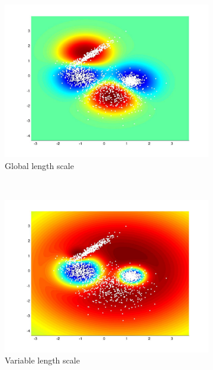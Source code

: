 \documentclass[useAMS,usenatbib,fleqn]{mn2e}
\begin{document}
\begin{figure}
         \begin{subfigure}[b]{70 px}
                \includegraphics[trim = 150px 100px 150px 70px, clip=true,width=\textwidth]{global4.jpg}
                \caption{Global length scale}
        \end{subfigure}
        ~
         \begin{subfigure}[b]{70 px}
                \includegraphics[trim = 150px 100px 150px 70px, clip=true,width=\textwidth]{VL4.jpg}
                \caption{Variable length scale}
        \end{subfigure}
        ~
        \begin{subfigure}[b]{70 px}

\end{subfigure}
\end{figure}
\end{document}
